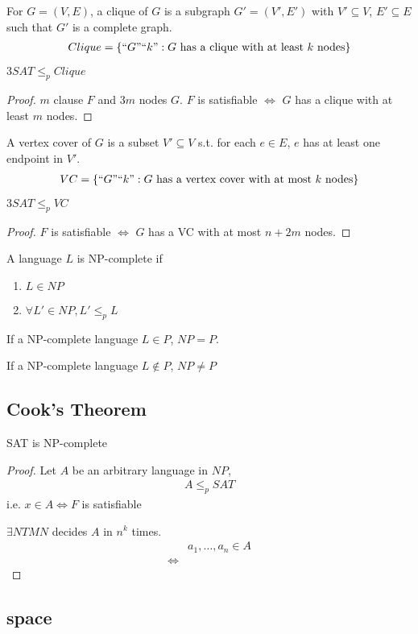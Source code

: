 \begin{definition}[Clique]
    For $G=(V,E)$, a clique of $G$ is a subgraph $G'=(V', E')$ with $V'\subseteq V$, $E'\subseteq E$ such that $G'$ is a complete graph. 
    \begin{align*}
        Clique=\{ {``G"}{``k"}: G \text{ has a clique with at least $k$ nodes}\}
    \end{align*}
\end{definition}

$3SAT\le_p Clique$
\begin{proof}
    $m$ clause $F$ and $3m$ nodes $G$. %
    $F$ is satisfiable $\iff$ $G$ has a clique with at least $m$ nodes. 
\end{proof}

\begin{definition}
    A vertex cover of $G$ is a subset $V'\subseteq V$ s.t. for each $e\in E$, $e$ has at least one endpoint in $V'$.
    \begin{align*}
        VC=\{ {``G"}{``k"}: G\text{ has a vertex cover with at most $k$ nodes} \}
    \end{align*}
\end{definition}

$3SAT\le_p VC$
\begin{proof}
    $F$ is satisfiable $\iff$ $G$ has a VC with at most $n+2m$ nodes. 
\end{proof}


\begin{definition}
    A language $L$ is NP-complete if
    \begin{enumerate}
        \item $L\in NP$
        \item $\forall L'\in NP, L'\le_p L$
    \end{enumerate}
\end{definition}

\begin{theorem}
    If a NP-complete language $L\in P$, $NP=P$. 

    If a NP-complete language $L\notin P$, $NP\ne P$
\end{theorem}

\subsection{Cook's Theorem}
\begin{theorem}
    SAT is NP-complete
\end{theorem}
\begin{proof}
    Let $A$ be an arbitrary language in $NP$, 
    \begin{align*}
        A\le_p SAT
    \end{align*}
    i.e. $x\in A\iff F$ is satisfiable

    $\exists NTM N$ decides $A$ in $n^k$ times.%
    \begin{align*}
        &a_1,\dots,a_n\in A\\
        \iff & 
    \end{align*}
\end{proof}

\subsection{space}
